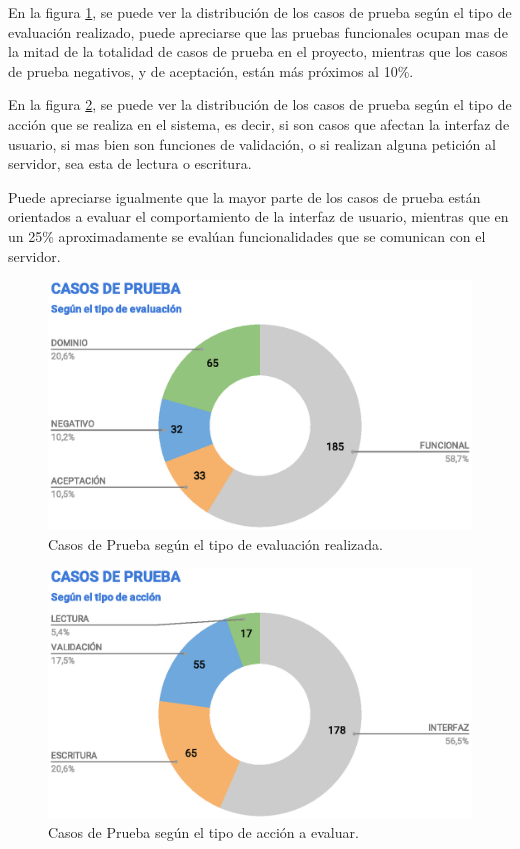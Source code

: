 En la figura \ref{tc-tests}, se puede ver la distribución de los casos de prueba
según el tipo de evaluación realizado, puede apreciarse que las pruebas
funcionales ocupan mas de la mitad de la totalidad de casos de prueba en el
proyecto, mientras que los casos de prueba negativos, y de aceptación, están más
próximos al 10\%.

En la figura \ref{tc-type}, se puede ver la distribución de los casos de prueba
según el tipo de acción que se realiza en el sistema, es decir, si son casos
que afectan la interfaz de usuario, si mas bien son funciones de validación, o
si realizan alguna petición al servidor, sea esta de lectura o escritura.

Puede apreciarse igualmente que la mayor parte de los casos de prueba están
orientados a evaluar el comportamiento de la interfaz de usuario, mientras que
en un 25\% aproximadamente se evalúan funcionalidades que se comunican con el
servidor.

\begin{figure}[H]
\centering
\includegraphics[width=1.0\textwidth]{graphics/tc-tests.eps}
\caption{Casos de Prueba según el tipo de evaluación realizada.}
\label{tc-tests}
\end{figure}

\begin{figure}[H]
\centering
\includegraphics[width=1.0\textwidth]{graphics/tc-type.eps}
\caption{Casos de Prueba según el tipo de acción a evaluar.}
\label{tc-type}
\end{figure}

